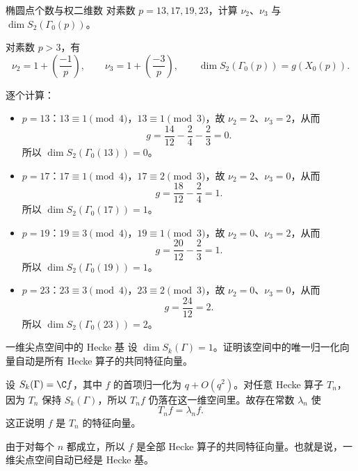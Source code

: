 \begin{problem}{椭圆点个数与权二维数}
\medium
对素数 $p=13,17,19,23$，计算 $\nu_2$、$\nu_3$ 与 $\dim S_2(\Gamma_0(p))$。
\end{problem}
\begin{solution}
对素数 $p>3$，有
\[
\nu_2=1+\left(\frac{-1}{p}\right),
\qquad
\nu_3=1+\left(\frac{-3}{p}\right),
\qquad
\dim S_2(\Gamma_0(p))=g(X_0(p)).
\]

逐个计算：
\begin{itemize}
  \item $p=13$：$13\equiv 1\pmod4$，$13\equiv 1\pmod3$，故 $\nu_2=2$、$\nu_3=2$，从而
  \[
  g=\frac{14}{12}-\frac{2}{4}-\frac{2}{3}=0.
  \]
  所以 $\dim S_2(\Gamma_0(13))=0$。

  \item $p=17$：$17\equiv 1\pmod4$，$17\equiv 2\pmod3$，故 $\nu_2=2$、$\nu_3=0$，从而
  \[
  g=\frac{18}{12}-\frac{2}{4}=1.
  \]
  所以 $\dim S_2(\Gamma_0(17))=1$。

  \item $p=19$：$19\equiv 3\pmod4$，$19\equiv 1\pmod3$，故 $\nu_2=0$、$\nu_3=2$，从而
  \[
  g=\frac{20}{12}-\frac{2}{3}=1.
  \]
  所以 $\dim S_2(\Gamma_0(19))=1$。

  \item $p=23$：$23\equiv 3\pmod4$，$23\equiv 2\pmod3$，故 $\nu_2=0$、$\nu_3=0$，从而
  \[
  g=\frac{24}{12}=2.
  \]
  所以 $\dim S_2(\Gamma_0(23))=2$。
\end{itemize}
\end{solution}

\begin{problem}{一维尖点空间中的 Hecke 基}
\medium
设 $\dim S_k(\Gamma)=1$。证明该空间中的唯一归一化向量自动是所有 Hecke 算子的共同特征向量。
\end{problem}
\begin{solution}
设 $S_k(\Gamma)=\C f$，其中 $f$ 的首项归一化为 $q+O(q^2)$。对任意 Hecke 算子 $T_n$，因为 $T_n$ 保持 $S_k(\Gamma)$，所以 $T_n f$ 仍落在这一维空间里。故存在常数 $\lambda_n$ 使
\[
T_n f=\lambda_n f.
\]
这正说明 $f$ 是 $T_n$ 的特征向量。

由于对每个 $n$ 都成立，所以 $f$ 是全部 Hecke 算子的共同特征向量。也就是说，一维尖点空间自动已经是 Hecke 基。
\end{solution}

